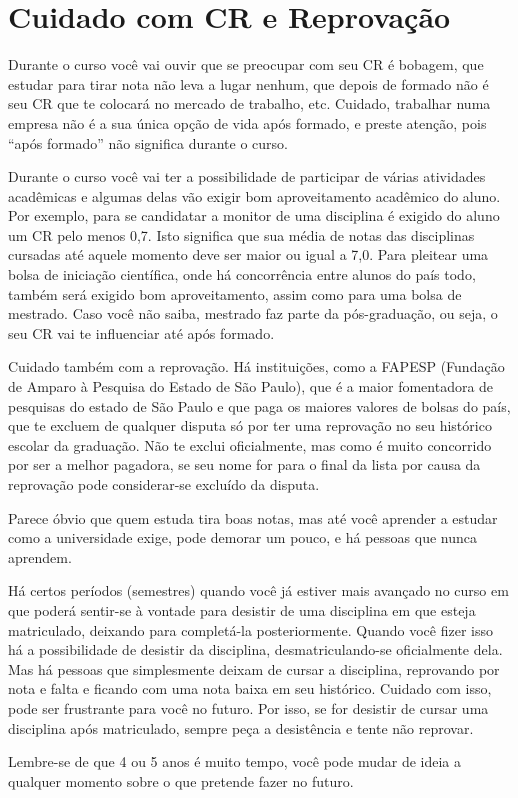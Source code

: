 
\section{Cuidado com CR e Reprovação}

Durante o curso você vai ouvir que se preocupar com seu CR é bobagem, que
estudar para tirar nota não leva a lugar nenhum, que depois de formado não é seu
CR que te colocará no mercado de trabalho, etc. Cuidado, trabalhar numa empresa
não é a sua única opção de vida após formado, e preste atenção, pois ``após
formado'' não significa durante o curso.

Durante o curso você vai ter a possibilidade de participar de várias atividades
acadêmicas e algumas delas vão exigir bom aproveitamento acadêmico do aluno. Por
exemplo, para se candidatar a monitor de uma disciplina é exigido do aluno um CR
pelo menos 0,7. Isto significa que sua média de notas das disciplinas cursadas
até aquele momento deve ser maior ou igual a 7,0. Para pleitear uma bolsa de
iniciação científica, onde há concorrência entre alunos do país todo, também
será exigido bom aproveitamento, assim como para uma bolsa de mestrado. Caso
você não saiba, mestrado faz parte da pós-graduação, ou seja, o seu CR vai te
influenciar até após formado.

Cuidado também com a reprovação. Há instituições, como a FAPESP (Fundação de
Amparo à Pesquisa do Estado de São Paulo), que é a maior fomentadora de
pesquisas do estado de São Paulo e que paga os maiores valores de bolsas do
país, que te excluem de qualquer disputa só por ter uma reprovação no seu
histórico escolar da graduação. Não te exclui oficialmente, mas como é muito
concorrido por ser a melhor pagadora, se seu nome for para o final da lista por
causa da reprovação pode considerar-se excluído da disputa.

Parece óbvio que quem estuda tira boas notas, mas até você aprender a estudar
como a universidade exige, pode demorar um pouco, e há pessoas que nunca
aprendem.

Há certos períodos (semestres) quando você já estiver mais avançado no curso em
que poderá sentir-se à vontade para desistir de uma disciplina em que esteja
matriculado, deixando para completá-la posteriormente. Quando você fizer isso há
a possibilidade de desistir da disciplina, desmatriculando-se oficialmente dela.
Mas há pessoas que simplesmente deixam de cursar a disciplina, reprovando por
nota e falta e ficando com uma nota baixa em seu histórico. Cuidado com isso,
pode ser frustrante para você no futuro. Por isso, se for desistir de cursar uma
disciplina após matriculado, sempre peça a desistência e tente não reprovar.

Lembre-se de que 4 ou 5 anos é muito tempo, você pode mudar de ideia a qualquer
momento sobre o que pretende fazer no futuro.
